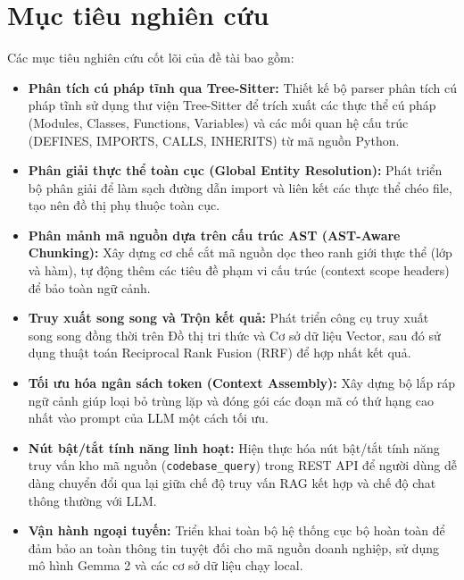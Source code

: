 \documentclass[12pt,a4paper,oneside]{report}
\begin{document}
\section{Mục tiêu nghiên cứu}
Các mục tiêu nghiên cứu cốt lõi của đề tài bao gồm:
\begin{itemize}
    \item \textbf{Phân tích cú pháp tĩnh qua Tree-Sitter:} Thiết kế bộ parser phân tích cú pháp tĩnh sử dụng thư viện Tree-Sitter để trích xuất các thực thể cú pháp (Modules, Classes, Functions, Variables) và các mối quan hệ cấu trúc (DEFINES, IMPORTS, CALLS, INHERITS) từ mã nguồn Python.
    \item \textbf{Phân giải thực thể toàn cục (Global Entity Resolution):} Phát triển bộ phân giải để làm sạch đường dẫn import và liên kết các thực thể chéo file, tạo nên đồ thị phụ thuộc toàn cục.
    \item \textbf{Phân mảnh mã nguồn dựa trên cấu trúc AST (AST-Aware Chunking):} Xây dựng cơ chế cắt mã nguồn dọc theo ranh giới thực thể (lớp và hàm), tự động thêm các tiêu đề phạm vi cấu trúc (context scope headers) để bảo toàn ngữ cảnh.
    \item \textbf{Truy xuất song song và Trộn kết quả:} Phát triển công cụ truy xuất song song đồng thời trên Đồ thị tri thức và Cơ sở dữ liệu Vector, sau đó sử dụng thuật toán Reciprocal Rank Fusion (RRF) để hợp nhất kết quả.
    \item \textbf{Tối ưu hóa ngân sách token (Context Assembly):} Xây dựng bộ lắp ráp ngữ cảnh giúp loại bỏ trùng lặp và đóng gói các đoạn mã có thứ hạng cao nhất vào prompt của LLM một cách tối ưu.
    \item \textbf{Nút bật/tắt tính năng linh hoạt:} Hiện thực hóa nút bật/tắt tính năng truy vấn kho mã nguồn (\texttt{codebase\_query}) trong REST API để người dùng dễ dàng chuyển đổi qua lại giữa chế độ truy vấn RAG kết hợp và chế độ chat thông thường với LLM.
    \item \textbf{Vận hành ngoại tuyến:} Triển khai toàn bộ hệ thống cục bộ hoàn toàn để đảm bảo an toàn thông tin tuyệt đối cho mã nguồn doanh nghiệp, sử dụng mô hình Gemma 2 và các cơ sở dữ liệu chạy local.
\end{itemize}
\end{document}
